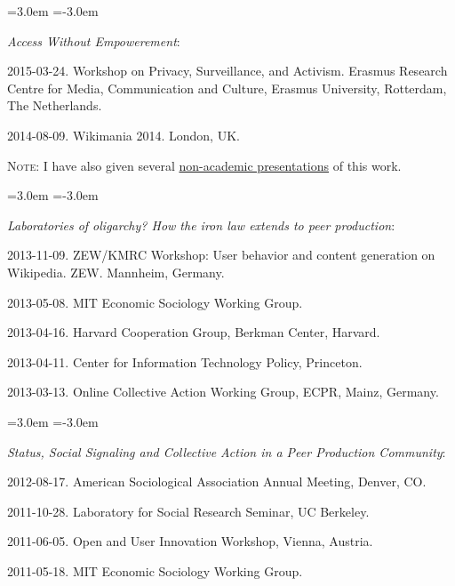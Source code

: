\documentclass[10pt]{article}
\newenvironment{cvlist}{
\begin{list}{}{\leftmargin=3.0em \itemindent=-3.0em}
  \setlength{\itemsep}{0pt}
  \setlength{\parskip}{0em}
  \setlength{\parsep}{1em}
  \setlength{\parindent}{0em}}
{\vspace{1em}
\end{list}}
\begin{document}
\begin{cvlist}
\item \emph{Access Without Empowerement}:
\item 2015-03-24. Workshop on Privacy, Surveillance, and Activism. Erasmus Research Centre for Media, Communication and Culture, Erasmus University, Rotterdam, The Netherlands.
\item 2014-08-09. Wikimania 2014. London, UK.
\item \textsc{Note:} I have also given several \href{https://mako.cc/talks/}{non-academic presentations} of this work.
\end{cvlist}

\begin{cvlist}
\item \emph{Laboratories of oligarchy? How the iron law extends to peer production}:
\item 2013-11-09. ZEW/KMRC Workshop: User behavior and content generation on Wikipedia.
ZEW. Mannheim, Germany.
\item 2013-05-08. MIT Economic Sociology Working Group.
\item 2013-04-16. Harvard Cooperation Group, Berkman Center, Harvard.
\item 2013-04-11. Center for Information Technology Policy, Princeton.
\item 2013-03-13. Online Collective Action Working Group, ECPR, Mainz, Germany.
\end{cvlist}

\begin{cvlist}
\item \emph{Status, Social Signaling and Collective Action in a Peer Production Community}:
\item 2012-08-17. American Sociological Association Annual Meeting, Denver, CO.
\item 2011-10-28. Laboratory for Social Research Seminar, UC Berkeley.
\item 2011-06-05. Open and User Innovation Workshop, Vienna, Austria.
\item 2011-05-18. MIT Economic Sociology Working Group.
\end{cvlist}
\end{document}
